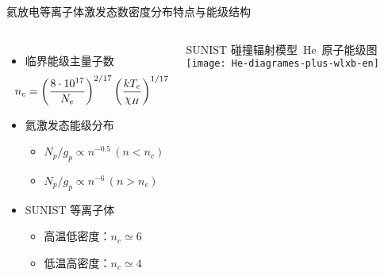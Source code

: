 \begin{CJK*}{UTF8}{kai}
\begin{frame}{氦放电等离子体激发态数密度分布特点与能级结构}
	\begin{columns}
			\begin{itemize}
				\item 临界能级主量子数\\ 
					\[
					\hspace{-1em}
					n_c=\left(\frac{8\cdot10^{17}}{N_e}\right)^{2/17}
        			\left(\frac{kT_e}{\chi_H}\right)^{1/17}
        			\]
        		\item 氦激发态能级分布\\ 
        			\begin{itemize}
						\item $N_p/g_p\propto n^{-0.5}\,(n<n_c)$
						\item $N_p/g_p\propto n^{-6}\,(n>n_c)$
					\end{itemize}
				\item SUNIST 等离子体
					\begin{itemize}
						\item 高温低密度：$n_c\simeq 6$
						\item 低温高密度：$n_c\simeq 4$
					\end{itemize}
			\end{itemize}
			\centering
			SUNIST 碰撞辐射模型~He~原子能级图\\
			\texttt{[image: He-diagrames-plus-wlxb-en]}
	\end{columns}
\end{frame}


\end{CJK*}
